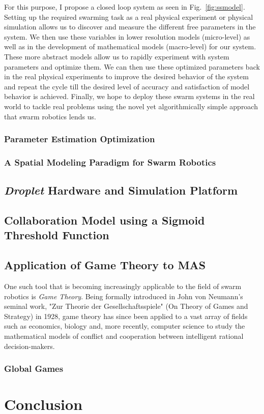 \documentclass[11pt, onecolumn, compsoc, letterpaper]{article}
\begin{document}
For this purpose, I propose a closed loop system as seen in Fig.~\ref{fig:ssmodel}. Setting up the required swarming task as a real physical experiment or physical simulation allows us to discover and measure the different free parameters in the system. We then use these variables in lower resolution models (micro-level) as well as in the development of mathematical models (macro-level) for our system. These more abstract models allow us to rapidly experiment with system parameters and optimize them. We can then use these optimized parameters back in the real physical experiments to improve the desired behavior of the system and repeat the cycle till the desired level of accuracy and satisfaction of  model behavior is achieved. Finally, we hope to deploy these swarm systems in the real world to tackle real problems using the novel yet algorithmically simple approach that swarm robotics lends us.

\subsubsection{Parameter Estimation Optimization}


\subsubsection{A Spatial Modeling Paradigm for Swarm Robotics}


\subsection{\emph{Droplet} Hardware and Simulation Platform}


\subsection{Collaboration Model using a Sigmoid Threshold Function}

\subsection{Application of Game Theory to MAS}
One such tool that is becoming increasingly applicable to the field of swarm robotics is \emph{Game Theory}. Being formally introduced in John von Neumann's seminal work, "Zur Theorie der Gesellschaftsspiele" (On Theory of Games and Strategy) in 1928, game theory has since been applied to a vast array of fields such as economics, biology and, more recently, computer science to study the mathematical models of conflict and cooperation between intelligent rational decision-makers.

\subsubsection{Global Games}



\section{Conclusion}

%


\end{document}
